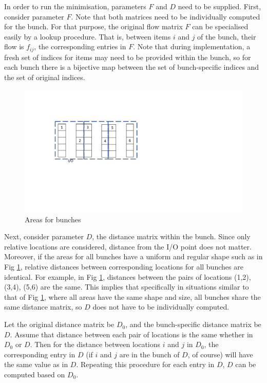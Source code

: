 \documentclass[hyp]{socreport}
\begin{document}
In order to run the minimisation, parameters $F$ and $D$ need to be supplied. First, consider parameter $F$. Note that both matrices need to be individually computed for the bunch. For that purpose, the original flow matrix $F$ can be specialised easily by a lookup procedure. That is, between items $i$ and $j$ of the bunch, their flow is $f_{ij}$, the corresponding entries in $F$. Note that during implementation, a fresh set of indices for items may need to be provided within the bunch, so for each bunch there is a bijective map between the set of bunch-specific indices and the set of original indices.

\begin{figure}
\includegraphics[scale=0.8]{bunches}
\centering
\caption{Areas for bunches}
\label{fig:buncharea}
\end{figure}

Next, consider parameter $D$, the distance matrix within the bunch. Since only relative locations are considered, distance from the I/O point does not matter. Moreover, if the areas for all bunches have a uniform and regular shape such as in Fig \ref{fig:buncharea}, relative distances between corresponding locations for all bunches are identical. For example, in Fig \ref{fig:buncharea}, distances between the pairs of locations (1,2), (3,4), (5,6) are the same. This implies that specifically in situations similar to that of Fig \ref{fig:buncharea}, where all areas have the same shape and size, all bunches share the same distance matrix, so $D$ does not have to be individually computed.

Let the original distance matrix be $D_0$, and the bunch-specific distance matrix be $D$. Assume that distance between each pair of locations is the same whether in $D_0$ or $D$. Then for the distance between locations $i$ and $j$ in $D_0$, the corresponding entry in $D$ (if $i$ and $j$ are in the bunch of $D$, of course) will have the same value as in $D$. Repeating this procedure for each entry in $D$, $D$ can be computed based on $D_0$.
\end{document}
